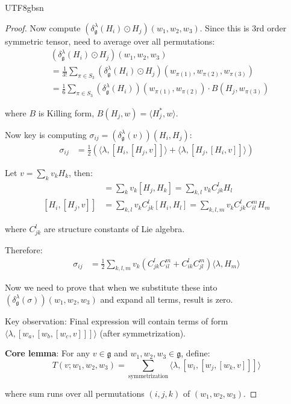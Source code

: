 \documentclass[a4paper,12pt]{extarticle}
\theoremstyle{definition}
\begin{document}
\begin{CJK}{UTF8}{gbsn}
\begin{proof}
Now compute $(\delta^\lambda_\mathfrak{g}(H_i) \odot H_j)(w_1, w_2, w_3)$. Since this is 3rd order symmetric tensor, need to average over all permutations:
\begin{align}
&(\delta^\lambda_\mathfrak{g}(H_i) \odot H_j)(w_1, w_2, w_3) \\
&= \frac{1}{3!} \sum_{\pi \in S_3} (\delta^\lambda_\mathfrak{g}(H_i) \odot H_j)(w_{\pi(1)}, w_{\pi(2)}, w_{\pi(3)}) \\
&= \frac{1}{6} \sum_{\pi \in S_3} (\delta^\lambda_\mathfrak{g}(H_i))(w_{\pi(1)}, w_{\pi(2)}) \cdot B(H_j, w_{\pi(3)})
\end{align}

where $B$ is Killing form, $B(H_j, w) = \langle H_j^*, w \rangle$.

Now key is computing $\sigma_{ij} = (\delta^\lambda_\mathfrak{g}(v))(H_i, H_j)$:
\begin{align}
\sigma_{ij} &= \frac{1}{2} \left( \langle \lambda, [H_i, [H_j, v]] \rangle + \langle \lambda, [H_j, [H_i, v]] \rangle \right)
\end{align}

Let $v = \sum_k v_k H_k$, then:
\begin{align}
[H_j, v] &= \sum_k v_k [H_j, H_k] = \sum_{k,l} v_k C_{jk}^l H_l \\
[H_i, [H_j, v]] &= \sum_{k,l} v_k C_{jk}^l [H_i, H_l] = \sum_{k,l,m} v_k C_{jk}^l C_{il}^m H_m
\end{align}

where $C_{jk}^l$ are structure constants of Lie algebra.

Therefore:
\begin{align}
\sigma_{ij} &= \frac{1}{2} \sum_{k,l,m} v_k \left( C_{jk}^l C_{il}^m + C_{ik}^l C_{jl}^m \right) \langle \lambda, H_m \rangle
\end{align}

Now we need to prove that when we substitute these into $(\delta^\lambda_\mathfrak{g}(\sigma))(w_1, w_2, w_3)$ and expand all terms, result is zero.

Key observation: Final expression will contain terms of form $\langle \lambda, [w_a, [w_b, [w_c, v]]] \rangle$ (after symmetrization).

\textbf{Core lemma}: For any $v \in \mathfrak{g}$ and $w_1, w_2, w_3 \in \mathfrak{g}$, define:
$$T(v; w_1, w_2, w_3) = \sum_{\text{symmetrization}} \langle \lambda, [w_i, [w_j, [w_k, v]]] \rangle$$

where sum runs over all permutations $(i,j,k)$ of $(w_1, w_2, w_3)$.


\end{proof}
\end{CJK}
\end{document}

